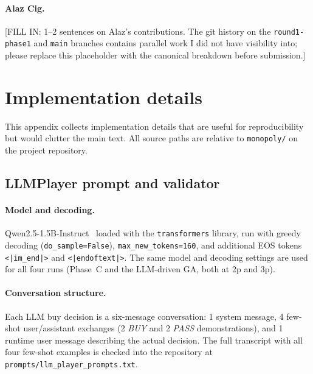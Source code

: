 \documentclass[10pt]{article}
\begin{document}
\paragraph{Alaz Cig.} %
[FILL IN: 1--2 sentences on Alaz's contributions. The git history
on the \texttt{round1-phase1} and \texttt{main} branches contains
parallel work I did not have visibility into; please replace this
placeholder with the canonical breakdown before submission.]

\appendix

\section{Implementation details}\label{app:impl}

This appendix collects implementation details that are useful for
reproducibility but would clutter the main text. All source paths
are relative to \texttt{monopoly/} on the project repository.

\subsection{LLMPlayer prompt and validator}\label{app:llm}

\paragraph{Model and decoding.} Qwen2.5-1.5B-Instruct~\cite{qwen25}
loaded with the \texttt{transformers} library, run with greedy
decoding (\texttt{do\_sample=False}), \texttt{max\_new\_tokens=160},
and additional EOS tokens \texttt{<|im\_end|>} and
\texttt{<|endoftext|>}. The same model and decoding settings are
used for all four runs (Phase~C and the LLM-driven GA, both at 2p
and 3p).

\paragraph{Conversation structure.} Each LLM buy decision is a
six-message conversation: 1 system message, 4 few-shot
user/assistant exchanges (2 \emph{BUY} and 2 \emph{PASS}
demonstrations), and 1 runtime user message describing the actual
decision. The full transcript with all four few-shot examples is
checked into the repository at
\texttt{prompts/llm\_player\_prompts.txt}.
\end{document}
